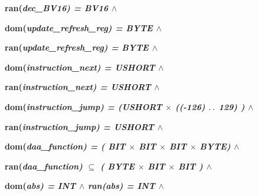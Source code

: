 \documentclass[11pt]{article}
\begin{document}
\begin{sloppypar}
\hspace*{0.20in}\bf ran\rm (\it dec\_BV16\rm ) \rm = \it BV16  $\land$ 

\hspace*{0.20in}

\hspace*{0.20in}\bf dom\rm (\it update\_refresh\_reg\rm ) \rm = \it BYTE  $\land$ 

\hspace*{0.20in}\bf ran\rm (\it update\_refresh\_reg\rm ) \rm = \it BYTE  $\land$ \hspace*{0.15in}

\hspace*{0.20in}

\hspace*{0.20in}\bf dom\rm (\it instruction\_next\rm ) \rm = \it USHORT  $\land$ 

\hspace*{0.20in}\bf ran\rm (\it instruction\_next\rm ) \rm = \it USHORT  $\land$ 

\hspace*{0.20in}

\hspace*{0.20in}\bf dom\rm (\it instruction\_jump\rm ) \rm = \rm (\it USHORT  $\times$  \rm (\rm (\rm -\rm 1\rm 2\rm 6\rm ) $\mathbin{\ldotp\ldotp}$ \rm 1\rm 2\rm 9\rm ) \rm )  $\land$ 

\hspace*{0.20in}\bf ran\rm (\it instruction\_jump\rm ) \rm = \it USHORT  $\land$ 

\hspace*{0.20in}

\hspace*{0.20in}

\hspace*{0.20in}\bf dom\rm (\it daa\_function\rm ) \rm = \rm ( \it BIT  $\times$  \it BIT  $\times$  \it BIT  $\times$  \it BYTE\hspace*{0.10in}\rm ) $\land$ 

\hspace*{0.20in}\bf ran\rm (\it daa\_function\rm )  $\subseteq$  \rm ( \it BYTE  $\times$  \it BIT  $\times$  \it BIT \rm )  $\land$ 

\hspace*{0.20in}

\hspace*{0.20in}\bf dom\rm (\it abs\rm ) \rm = \bf INT  $\land$  \bf ran\rm (\it abs\rm ) \rm = \bf INT  $\land$  

\hspace*{0.20in}


\end{sloppypar}
\end{document}
